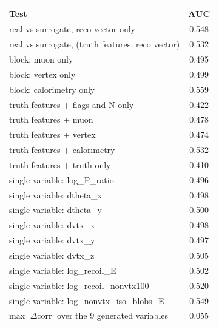 \begin{tabular}{lc}
\toprule
Test & AUC \\
\midrule
real vs surrogate, reco vector only & 0.548 \\
real vs surrogate, (truth features, reco vector) & 0.532 \\
\midrule
block: muon only & 0.495 \\
block: vertex only & 0.499 \\
block: calorimetry only & 0.559 \\
truth features + flags and N only & 0.422 \\
truth features + muon & 0.478 \\
truth features + vertex & 0.474 \\
truth features + calorimetry & 0.532 \\
truth features + truth only & 0.410 \\
single variable: log\_P\_ratio & 0.496 \\
single variable: dtheta\_x & 0.498 \\
single variable: dtheta\_y & 0.500 \\
single variable: dvtx\_x & 0.498 \\
single variable: dvtx\_y & 0.497 \\
single variable: dvtx\_z & 0.505 \\
single variable: log\_recoil\_E & 0.502 \\
single variable: log\_recoil\_nonvtx100 & 0.520 \\
single variable: log\_nonvtx\_iso\_blobs\_E & 0.549 \\
\midrule
max $|\Delta$corr$|$ over the 9 generated variables & 0.055 \\
\bottomrule
\end{tabular}
